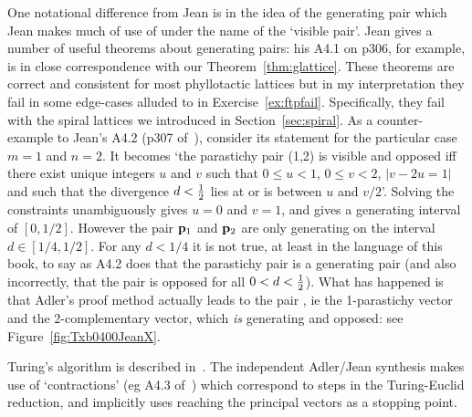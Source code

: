 One notational difference from Jean is in the idea of the generating pair which Jean makes much of use of under the name of the `visible pair'. Jean gives a number of useful theorems about generating pairs: his A4.1 on p306, for example,  is in close correspondence with our Theorem~\ref{thm:glattice}. These theorems are correct and consistent for most phyllotactic lattices but in my interpretation they fail in some edge-cases  alluded to in Exercise~\ref{ex:ftpfail}. Specifically, they fail with the spiral lattices we introduced in Section~\ref{sec:spiral}.
As a counter-example to Jean's A4.2 (p307 of~\cite{jeanPhyllotaxisSystemicStudy1994}), consider its statement for the particular case  $m=1$ and $n=2$. It becomes `the parastichy pair (1,2) is visible and opposed iff there exist unique integers $u$ and $v$ such that $0\leq u<1$, $0\leq v<2$, $|v-2u=1|$ and such that the divergence $d<\textstyle{\frac{1}{2}}$ lies at or is between $u$ and $v/2$'. Solving the constraints unambiguously gives $u=0$ and $v=1$, and gives a generating interval of $[0,1/2]$.  However the pair ${\mathbf p}_{1}$ and ${\mathbf p}_{2}$ are only generating on the interval $d\in [1/4,1/2]$. 
 For any $d<1/4$ it is not true, at least in the language of this book, to say as  
 A4.2 does that the parastichy pair   is a generating pair (and also incorrectly, that the pair is opposed for all $0<d<\textstyle{\frac{1}{2}}$).  What has happened is that Adler's proof method actually leads to the pair , ie the 1-parastichy vector and the 2-complementary vector, which \textit{is} generating and opposed: see Figure~\ref{fig:Txb0400JeanX}.
 


Turing's algorithm is described in~\cite{turingMorphogenTheoryPhyllotaxis2013}. The independent Adler/Jean synthesis  makes use of `contractions' (eg A4.3 of~\cite{jeanPhyllotaxisSystemicStudy1994}) which correspond to steps in the Turing-Euclid reduction, and implicitly uses reaching the principal  vectors as a stopping point. 

